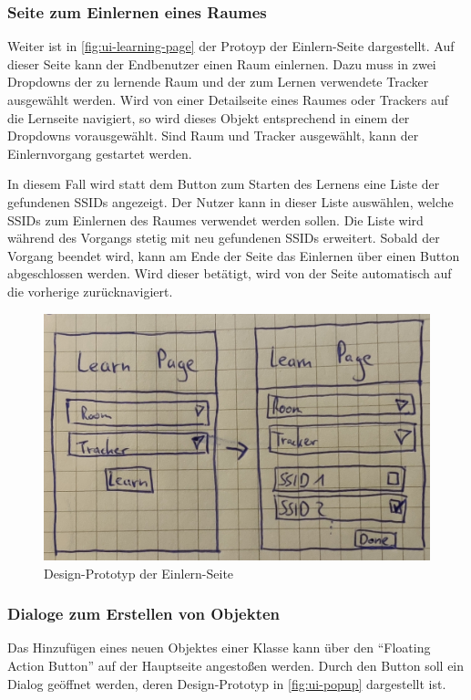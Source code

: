 \subsubsection{Seite zum Einlernen eines Raumes}

Weiter ist in \autoref{fig:ui-learning-page} der Protoyp der Einlern-Seite dargestellt.
Auf dieser Seite kann der Endbenutzer einen Raum einlernen.
Dazu muss in zwei Dropdowns der zu lernende Raum und der zum Lernen verwendete Tracker ausgewählt werden.
Wird von einer Detailseite eines Raumes oder Trackers auf die Lernseite navigiert, so wird dieses Objekt entsprechend in einem der Dropdowns vorausgewählt.
Sind Raum und Tracker ausgewählt, kann der Einlernvorgang gestartet werden.

In diesem Fall wird statt dem Button zum Starten des Lernens eine Liste der gefundenen \glspl{SSID} angezeigt.
Der Nutzer kann in dieser Liste auswählen, welche \glspl{SSID} zum Einlernen des Raumes verwendet werden sollen.
Die Liste wird während des Vorgangs stetig mit neu gefundenen \glspl{SSID} erweitert.
Sobald der Vorgang beendet wird, kann am Ende der Seite das Einlernen über einen Button abgeschlossen werden.
Wird dieser betätigt, wird von der Seite automatisch auf die vorherige zurücknavigiert.

\begin{figure}[h!tbp]
	\includegraphics[width=.7\textwidth]{images/ui-prototype/learning_page.jpg}
	\centering
	\caption{Design-Prototyp der Einlern-Seite}
	\label{fig:ui-learning-page}
\end{figure}

\subsubsection{Dialoge zum Erstellen von Objekten} \label{sec:app-dialog}

Das Hinzufügen eines neuen Objektes einer Klasse kann über den \enquote{Floating Action Button} auf der Hauptseite angestoßen werden.
Durch den Button soll ein Dialog geöffnet werden, deren Design-Prototyp in \autoref{fig:ui-popup} dargestellt ist.

